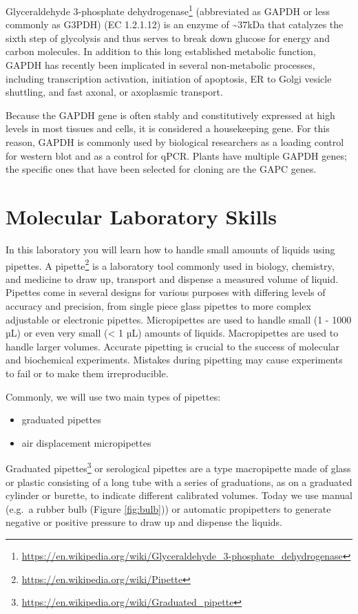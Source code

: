\documentclass[]{book}
\providecommand{\tightlist}{%
  \setlength{\itemsep}{0pt}\setlength{\parskip}{0pt}}
\let\rmarkdownfootnote\footnote%
\def\footnote{\protect\rmarkdownfootnote}
\renewcommand{\href}[2]{#2\footnote{\url{#1}}}
\theoremstyle{definition}
\theoremstyle{definition}
\theoremstyle{definition}
\theoremstyle{remark}
\begin{document}
\href{https://en.wikipedia.org/wiki/Glyceraldehyde_3-phosphate_dehydrogenase}{Glyceraldehyde
3-phosphate dehydrogenase} (abbreviated as GAPDH or less commonly as
G3PDH) (EC 1.2.1.12) is an enzyme of \textasciitilde{}37kDa that
catalyzes the sixth step of glycolysis and thus serves to break down
glucose for energy and carbon molecules. In addition to this long
established metabolic function, GAPDH has recently been implicated in
several non-metabolic processes, including transcription activation,
initiation of apoptosis, ER to Golgi vesicle shuttling, and fast axonal,
or axoplasmic transport.

Because the GAPDH gene is often stably and constitutively expressed at
high levels in most tissues and cells, it is considered a housekeeping
gene. For this reason, GAPDH is commonly used by biological researchers
as a loading control for western blot and as a control for qPCR. Plants
have multiple GAPDH genes; the specific ones that have been selected for
cloning are the GAPC genes.

\chapter{Molecular Laboratory Skills}\label{molecular-laboratory-skills}

In this laboratory you will learn how to handle small amounts of liquids
using pipettes. A \href{https://en.wikipedia.org/wiki/Pipette}{pipette}
is a laboratory tool commonly used in biology, chemistry, and medicine
to draw up, transport and dispense a measured volume of liquid. Pipettes
come in several designs for various purposes with differing levels of
accuracy and precision, from single piece glass pipettes to more complex
adjustable or electronic pipettes. Micropipettes are used to handle
small (1 - 1000 µL) or even very small (\textless{} 1 µL) amounts of
liquids. Macropipettes are used to handle larger volumes. Accurate
pipetting is crucial to the success of molecular and biochemical
experiments. Mistakes during pipetting may cause experiments to fail or
to make them irreproducible.

Commonly, we will use two main types of pipettes:

\begin{itemize}
\tightlist
\item
  graduated pipettes
\item
  air displacement micropipettes
\end{itemize}

\href{https://en.wikipedia.org/wiki/Graduated_pipette}{Graduated
pipettes} or serological pipettes are a type macropipette made of glass
or plastic consisting of a long tube with a series of graduations, as on
a graduated cylinder or burette, to indicate different calibrated
volumes. Today we use manual (e.g.~a rubber bulb (Figure
\ref{fig:bulb})) or automatic propipetters to generate negative or
positive pressure to draw up and dispense the liquids.
\end{document}
